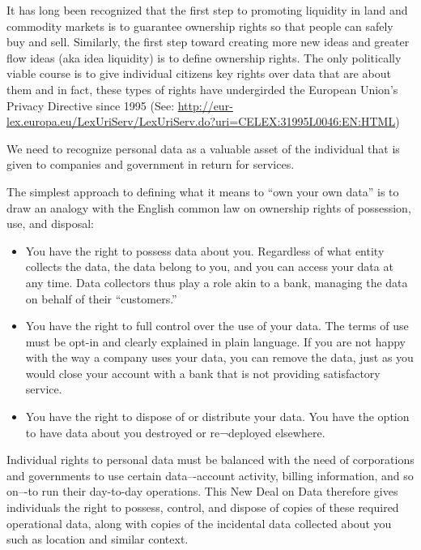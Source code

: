 It has long been recognized that the first step to promoting liquidity in land and commodity markets is to guarantee ownership rights so that people can safely buy and sell.
Similarly, the first step toward creating more new ideas and greater flow ideas (aka idea liquidity) is to define ownership rights.
The only politically viable course is to give individual citizens key rights over data that are about them and in fact, these types of rights have undergirded the European Union's Privacy Directive since 1995 (See: \url{http://eur-lex.europa.eu/LexUriServ/LexUriServ.do?uri=CELEX:31995L0046:EN:HTML})

We need to recognize personal data as a valuable asset of the individual that is given to companies and government in return for services.

The simplest approach to defining what it means to “own your own data” is to draw an analogy with the English common law on ownership rights of possession, use, and disposal:

\begin{itemize}
\item You have the right to possess data about you. Regardless of what entity collects the data, the data belong to you, and you can access your data at any time. Data collectors thus play a role akin to a bank, managing the data on behalf of their “customers.”

\item You have the right to full control over the use of your data. The terms of use must be opt-in and clearly explained in plain language. If you are not happy with the way a company uses your data, you can remove the data, just as you would close your account with a bank that is not providing satisfactory service.

\item You have the right to dispose of or distribute your data. You have the option to have data about you destroyed or re¬deployed elsewhere.

\end{itemize}

Individual rights to personal data must be balanced with the need of corporations and governments to use certain data–-account activity, billing information, and so on–-to run their day-to-day operations.
This New Deal on Data therefore gives individuals the right to possess, control, and dispose of copies of these required operational data, along with copies of the incidental data collected about you such as location and similar context.

